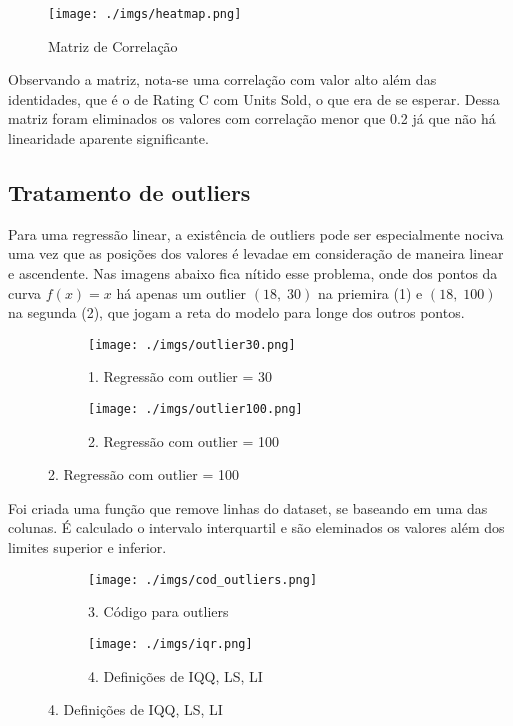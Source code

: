 \documentclass[12pt, a4paper]{article}
\begin{document}
\FloatBarrier
\begin{figure}[h]
\texttt{[image: ./imgs/heatmap.png]}
\caption*{Matriz de Correlação}
\end{figure}
\FloatBarrier 


Observando a matriz, nota-se uma correlação com valor alto além das identidades, que é o de Rating C com Units Sold, o que era de se esperar. Dessa matriz foram eliminados os valores com correlação menor que 0.2 já que não há linearidade aparente significante.

\subsection{Tratamento de outliers}

Para uma regressão linear, a existência de outliers pode ser especialmente nociva uma vez que as posições dos valores é levadae em consideração de maneira linear e ascendente. Nas imagens abaixo fica nítido esse problema, onde dos pontos da curva $f(x) = x$ há apenas um outlier $(18,\;30)$ na priemira (1) e $(18,\; 100)$ na segunda (2), que jogam a reta do modelo para longe dos outros pontos.\\

\FloatBarrier
\begin{figure}[h]
  \begin{subfigure}[b]{0.4\textwidth}
    \texttt{[image: ./imgs/outlier30.png]}
    \caption*{1. Regressão com outlier = 30}
    \label{fig:1}
  \end{subfigure}\hspace{1.5cm}
  \begin{subfigure}[b]{0.5\textwidth}
    \texttt{[image: ./imgs/outlier100.png]}
    \caption*{2. Regressão com outlier = 100}
    \label{fig:2}
  \end{subfigure}
\end{figure}
\FloatBarrier

Foi criada uma função que remove linhas do dataset, se baseando em uma das colunas. É calculado o intervalo interquartil e são eleminados os valores além dos limites superior e inferior.

\FloatBarrier
\begin{figure}[h]
  \begin{subfigure}[b]{0.4\textwidth}
    \texttt{[image: ./imgs/cod\_outliers.png]}
    \caption*{3. Código para outliers}
    \label{fig:1}
  \end{subfigure}\hspace{1cm}
  \begin{subfigure}[b]{0.5\textwidth}
    \texttt{[image: ./imgs/iqr.png]}
    \caption*{4. Definições de IQQ, LS, LI}
    \label{fig:2}
  \end{subfigure}
\end{figure}
\FloatBarrier
\end{document}
